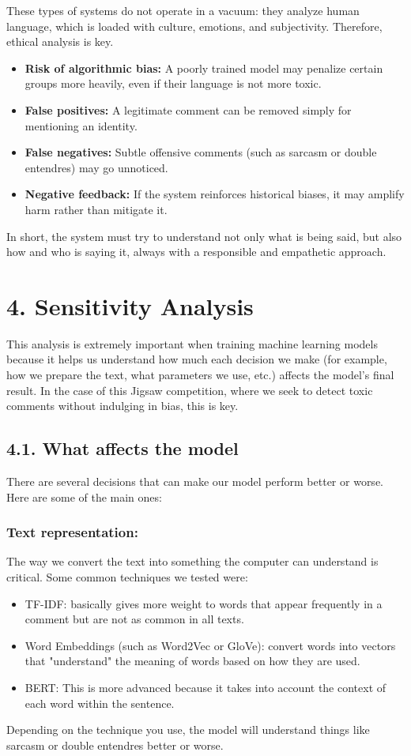 \documentclass[a4paper,12pt]{article}
\begin{document}
These types of systems do not operate in a vacuum: they analyze human language, which is loaded with culture, emotions, and subjectivity. Therefore, ethical analysis is key.

\begin{itemize}
    \item \textbf{Risk of algorithmic bias:} A poorly trained model may penalize certain groups more heavily, even if their language is not more toxic.
    \item \textbf{False positives:} A legitimate comment can be removed simply for mentioning an identity.
    \item \textbf{False negatives:} Subtle offensive comments (such as sarcasm or double entendres) may go unnoticed.
    \item \textbf{Negative feedback:} If the system reinforces historical biases, it may amplify harm rather than mitigate it.
\end{itemize}

In short, the system must try to understand not only what is being said, but also how and who is saying it, always with a responsible and empathetic approach.

\section*{4. Sensitivity Analysis}

This analysis is extremely important when training machine learning models because it helps us understand how much each decision we make (for example, how we prepare the text, what parameters we use, etc.) affects the model's final result. In the case of this Jigsaw competition, where we seek to detect toxic comments without indulging in bias, this is key.

\subsection*{4.1. What affects the model}

There are several decisions that can make our model perform better or worse. Here are some of the main ones:

\subsubsection*{Text representation:}
The way we convert the text into something the computer can understand is critical. Some common techniques we tested were:
\begin{itemize}
    \item TF-IDF: basically gives more weight to words that appear frequently in a comment but are not as common in all texts.
    \item Word Embeddings (such as Word2Vec or GloVe): convert words into vectors that "understand" the meaning of words based on how they are used.
    \item BERT: This is more advanced because it takes into account the context of each word within the sentence.
\end{itemize}
Depending on the technique you use, the model will understand things like sarcasm or double entendres better or worse.
\end{document}
